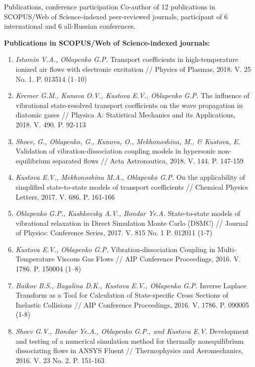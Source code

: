 \documentclass{resume} %
\begin{document}
\pagebreak

\begin{rSection}{Publications, conference participation}
Co-author of 12 publications in SCOPUS/Web of Science-indexed peer-reviewed journals, participant of 6 international and 6 all-Russian conferences.

{\bf Publications in SCOPUS/Web of Science-indexed journals:}

\begin{enumerate}
\item \emph{Istomin V.A., Oblapenko G.P.} Transport coefficients in high-temperature ionized air flows with electronic excitation // Physics of Plasmas, 2018. V. 25 No. 1. P. 013514 (1--10)

\item \emph{Kremer G.M., Kunova O.V., Kustova E.V., Oblapenko G.P.} The influence of vibrational state-resolved transport coefficients on the wave propagation in diatomic gases // Physica A: Statistical Mechanics and its Applications, 2018. V. 490. P. 92-113

\item \emph{Shoev, G., Oblapenko, G., Kunova, O., Mekhonoshina, M., \& Kustova, E.} Validation of vibration-dissociation coupling models in hypersonic non-equilibrium separated flows // Acta Astronautica, 2018. V. 144. P. 147-159

\item \emph{Kustova E.V., Mekhonoshina M.A., Oblapenko G.P.} On the applicability of simplified state-to-state models of transport coefficients // Chemical Physics Letters, 2017. V. 686. P. 161-166

\item \emph{Oblapenko G.P., Kashkovsky A.V., Bondar Ye.A.} State-to-state models of vibrational relaxation in Direct Simulation Monte Carlo (DSMC) // Journal of Physics: Conference Series, 2017. V. 815 No. 1 P. 012011 (1-7)

\item  \emph{Kustova E.V., Oblapenko G.P.} Vibration-dissociation Coupling in Multi-Temperature Viscous Gas Flows // AIP Conference Proceedings, 2016. V. 1786. P. 150004 (1–8)

\item  \emph{Baikov B.S., Bayalina D.K., Kustova E.V., Oblapenko G.P.} Inverse Laplace Transform as a Tool for Calculation of State-specific Cross Sections of Inelastic Collisions // AIP Conference Proceedings, 2016. V. 1786. P. 090005 (1-8)

\item  \emph{Shoev G.V., Bondar Ye.A., Oblapenko G.P., and Kustova E.V.} Development and testing of a numerical simulation method for thermally nonequilibrium dissociating flows in ANSYS Fluent // Thermophysics and Aeromechanics, 2016. V. 23 No. 2. P. 151-163


\end{enumerate}
\end{rSection}
\end{document}
